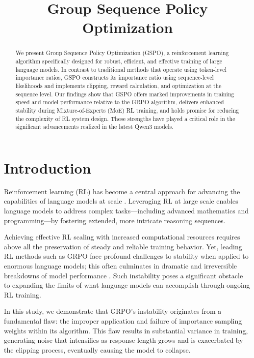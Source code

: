 \title{Group Sequence Policy Optimization}

\begin{abstract}
We present Group Sequence Policy Optimization (GSPO), a reinforcement learning algorithm specifically designed for robust, efficient, and effective training of large language models. In contrast to traditional methods that operate using token-level importance ratios, GSPO constructs its importance ratio using sequence-level likelihoods and implements clipping, reward calculation, and optimization at the sequence level. Our findings show that GSPO offers marked improvements in training speed and model performance relative to the GRPO algorithm, delivers enhanced stability during Mixture-of-Experts (MoE) RL training, and holds promise for reducing the complexity of RL system design. These strengths have played a critical role in the significant advancements realized in the latest Qwen3 models.
\end{abstract}

\section{Introduction}
\label{sec:intro}

Reinforcement learning (RL) has become a central approach for advancing the capabilities of language models at scale \citep{o1,dpsk-r1,qwq32b,qwen3}. Leveraging RL at large scale enables language models to address complex tasks—including advanced mathematics and programming—by fostering extended, more intricate reasoning sequences.

Achieving effective RL scaling with increased computational resources requires above all the preservation of steady and reliable training behavior. Yet, leading RL methods such as GRPO \citep{grpo} face profound challenges to stability when applied to enormous language models; this often culminates in dramatic and irreversible breakdowns of model performance \citep{qwen3, minimax-m1}. Such instability poses a significant obstacle to expanding the limits of what language models can accomplish through ongoing RL training.

In this study, we demonstrate that GRPO's instability originates from a fundamental flaw: the improper application and failure of importance sampling weights within its algorithm. This flaw results in substantial variance in training, generating noise that intensifies as response length grows and is exacerbated by the clipping process, eventually causing the model to collapse.

